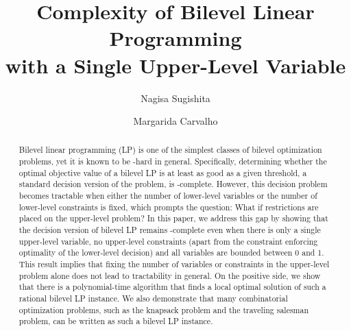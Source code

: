 \documentclass[runningheads,orivec]{llncs}
\newcommand{\MacroColor}[1]{#1}
\newcommand{\ComplexityClassStyle}[1]{#1}
\newcommand{\ClassNP}{\MacroColor{\text{\ComplexityClassStyle{NP}}}}
\begin{document}

\title{Complexity of Bilevel Linear Programming\\with a Single Upper-Level Variable}
%

\author{Nagisa Sugishita \and
Margarida Carvalho}
%
%
%


\maketitle              %
%
\begin{abstract}
Bilevel linear programming (LP) is one of the simplest classes of bilevel optimization problems, yet it is known to be \ClassNP{}-hard in general. Specifically, determining whether the optimal objective value of a bilevel LP is at least as good as a given threshold, a standard decision version of the problem, is \ClassNP{}-complete. However, this decision problem becomes tractable when either the number of lower-level variables or the number of lower-level constraints is fixed, which prompts the question: What if restrictions are placed on the upper-level problem? In this paper, we address this gap by showing that the decision version of bilevel LP remains \ClassNP{}-complete even when there is only a single upper-level variable, no upper-level constraints (apart from the constraint enforcing optimality of the lower-level decision) and all variables are bounded between 0 and 1. This result implies that fixing the number of variables or constraints in the upper-level problem alone does not lead to tractability in general. On the positive side, we show that there is a polynomial-time algorithm that finds a local optimal solution of such a rational bilevel LP instance. We also demonstrate that many combinatorial optimization problems, such as the knapsack problem and the traveling salesman problem, can be written as such a bilevel LP instance.
\end{abstract}
%
%
%
\end{document}
